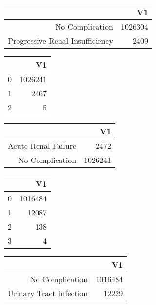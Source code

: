 \bigskip\bigskip
\centering
\begin{tabular}{rr}
  \hline
 & V1 \\ 
  \hline
No Complication & 1026304 \\ 
  Progressive Renal Insufficiency & 2409 \\ 
   \hline
\end{tabular}

\bigskip\bigskip
\centering
\begin{tabular}{rr}
  \hline
 & V1 \\ 
  \hline
0 & 1026241 \\ 
  1 & 2467 \\ 
  2 &   5 \\ 
   \hline
\end{tabular}

\bigskip\bigskip
\centering
\begin{tabular}{rr}
  \hline
 & V1 \\ 
  \hline
Acute Renal Failure & 2472 \\ 
  No Complication & 1026241 \\ 
   \hline
\end{tabular}

\bigskip\bigskip
\centering
\begin{tabular}{rr}
  \hline
 & V1 \\ 
  \hline
0 & 1016484 \\ 
  1 & 12087 \\ 
  2 & 138 \\ 
  3 &   4 \\ 
   \hline
\end{tabular}

\bigskip\bigskip
\centering
\begin{tabular}{rr}
  \hline
 & V1 \\ 
  \hline
No Complication & 1016484 \\ 
  Urinary Tract Infection & 12229 \\ 
   \hline
\end{tabular}

